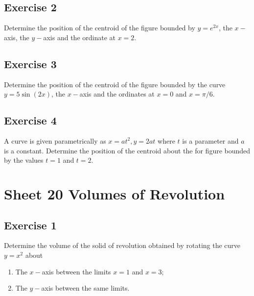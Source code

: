 \documentclass[
  11pt,
  oneside]{book}
\providecommand{\tightlist}{%
  \setlength{\itemsep}{0pt}\setlength{\parskip}{0pt}}
\newcommand{\slide}{}
\theoremstyle{definition}
\theoremstyle{definition}
\theoremstyle{definition}
\theoremstyle{definition}
\theoremstyle{remark}
\begin{document}
\slide

\subsection*{Exercise 2}\label{exercise-2-10}

Determine the position of the centroid of the figure bounded by \(y = e^{2x}\), the \(x-\)axis, the \(y-\)axis and the ordinate at \(x = 2\).

\slide

\subsection*{Exercise 3}\label{exercise-3-8}

Determine the position of the centroid of the figure bounded by the curve \(y = 5\sin(2x)\), the \(x-\)axis and the ordinates at \(x = 0\) and \(x = \pi/6\).

\slide

\subsection*{Exercise 4}\label{exercise-4-6}

A curve is given parametrically as \(x = at^2, y = 2at\) where \(t\) is a parameter and \(a\) is a constant. Determine the position of the centroid about the for figure bounded by the values \(t = 1\) and \(t = 2\).

\slide

\section{Sheet 20 Volumes of Revolution}\label{sheet-20-volumes-of-revolution}

\slide

\subsection*{Exercise 1}\label{exercise-1-11}

Determine the volume of the solid of revolution obtained by rotating the curve \(y = x^2\) about

\begin{enumerate}
\def\labelenumi{\arabic{enumi}.}
\tightlist
\item
  The \(x-\)axis between the limits \(x = 1\) and \(x = 3\);
\item
  The \(y-\)axis between the same limits.
\end{enumerate}
\end{document}
